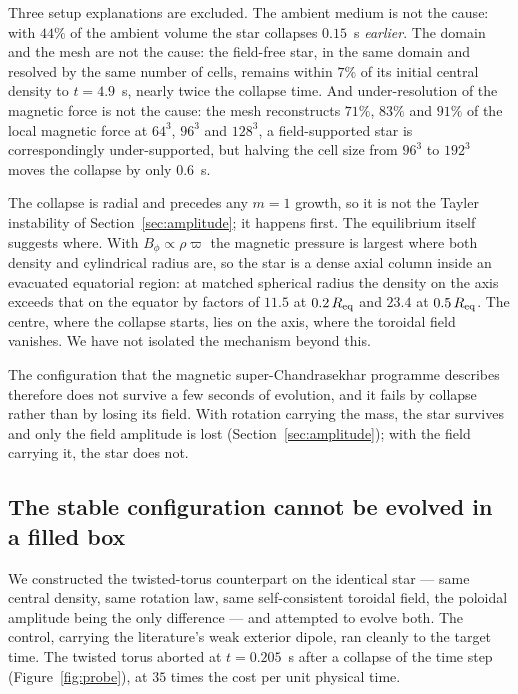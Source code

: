 \documentclass[twocolumn,linenumbers]{aastex701}
\begin{document}
Three setup explanations are excluded. The ambient medium is not the cause:
with $44\%$ of the ambient volume the star collapses $0.15$~s \emph{earlier}.
The domain and the mesh are not the cause: the field-free star, in the same
domain and resolved by the same number of cells, remains within $7\%$ of its
initial central density to $t = 4.9$~s, nearly twice the collapse time.
And under-resolution of the magnetic force is not the cause: the mesh
reconstructs $71\%$, $83\%$ and $91\%$ of the local magnetic force at $64^3$,
$96^3$ and $128^3$, a field-supported star is correspondingly under-supported,
but halving the cell size from $96^3$ to $192^3$ moves the collapse by only
$0.6$~s.

The collapse is radial and precedes any $m=1$ growth, so it is not the Tayler
instability of Section~\ref{sec:amplitude}; it happens first. The equilibrium itself
suggests where. With $B_\phi \propto \rho\varpi$ the magnetic pressure is
largest where both density and cylindrical radius are, so the star is a dense
axial column inside an evacuated equatorial region: at matched spherical
radius the density on the axis exceeds that on the equator by factors of
$11.5$ at $0.2\,R_{\rm eq}$ and $23.4$ at $0.5\,R_{\rm eq}$. The centre, where
the collapse starts, lies on the axis, where the toroidal field vanishes. We
have not isolated the mechanism beyond this.

The configuration that the magnetic super-Chandrasekhar programme describes
therefore does not survive a few seconds of evolution, and it fails by
collapse rather than by losing its field. With rotation carrying the mass,
the star survives and only the field amplitude is lost
(Section~\ref{sec:amplitude}); with the field carrying it, the star does not.

\subsection{The stable configuration cannot be evolved in a filled box}

We constructed the twisted-torus counterpart on the identical star --- same
central density, same rotation law, same self-consistent toroidal field, the
poloidal amplitude being the only difference --- and attempted to evolve both.
The control, carrying the literature's weak exterior dipole, ran cleanly to
the target time. The twisted torus aborted at $t = 0.205$~s after a collapse of the time step
(Figure~\ref{fig:probe}), at $35$ times the cost per unit physical time.
\end{document}
